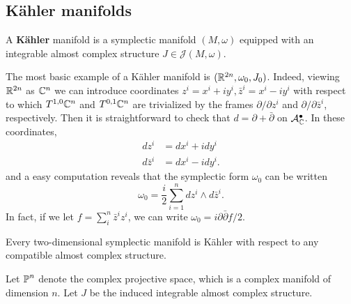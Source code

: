 \documentclass{amsart}
\begin{document}
\subsection{K\"ahler manifolds}

\begin{definition}
    A \textbf{K\"ahler} manifold is a symplectic manifold $(M,\omega)$ equipped
    with an integrable almost complex structure $J\in\mathcal{J}(M,\omega)$.
\end{definition}

\begin{example}
    The most basic example of a K\"ahler manifold is $(\mathbb{R}^{2n},\omega_0,J_0)$.
    Indeed, viewing $\mathbb{R}^{2n}$ as $\mathbb{C}^n$ we can introduce coordinates $z^i=x^i+iy^i,\bar z^i=x^i-iy^i$ with
    respect to which $T^{1,0}\mathbb{C}^{n}$ and $T^{0,1}\mathbb{C}^{n}$ are trivialized by
    the frames $\partial/\partial z^i$ and $\partial/\partial \bar z^i$, respectively.
    Then it is straightforward to check that $d=\partial+\bar\partial$ on $\mathcal{A}^\bullet_{\mathbb{C}}$.
    In these coordinates,
    \begin{align*}
        dz^i &= dx^i+idy^i\\
        d\bar z^i &= dx^i - idy^i.
    \end{align*}
    and a easy computation reveals that the symplectic form $\omega_0$ can be written
    \begin{equation*}
        \omega_0 = \frac{i}{2}\sum_{i=1}^ndz^i\wedge d\bar z^i.
    \end{equation*}
    In fact, if we let $f=\sum_i^n\bar z^iz^i$, we can write $\omega_0=i\partial\bar\partial f/2$.
\end{example}

\begin{example}
    Every two-dimensional symplectic manifold is K\"ahler with respect to any compatible
    almost complex structure.
\end{example}

\begin{example}
    Let $\operatorname{\mathbb{P}}^n$ denote the complex projective space, which is a complex manifold of dimension $n$. 
    Let $J$ be the induced integrable almost complex structure.
\end{example}
\end{document}
